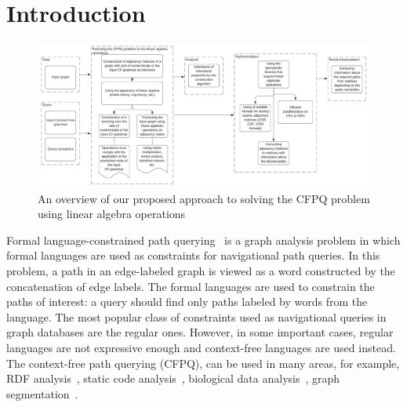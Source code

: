 \documentclass[sigconf, nonacm]{acmart}
\newcommand\vldbavailabilityurl{http://vldb.org/pvldb/format_vol14.html}
\begin{document}

\section{Introduction}

\begin{figure}[t]
	\centering
	\includegraphics[width=\linewidth]{figures/schema eng.pdf}
	\caption{An overview of our proposed approach to solving the CFPQ problem using linear algebra operations}
	\label{fig:schema}
\end{figure}

Formal language-constrained path querying~\cite{doi:10.1137/S0097539798337716} is a graph analysis problem in which formal languages are used as constraints for
navigational path queries. In this problem, a path in an edge-labeled graph is viewed
as a word constructed by the concatenation of edge labels. The formal languages are used to constrain the paths of interest: a query should find only paths labeled by words from the language. The most popular class of constraints used as navigational queries in graph databases are the regular ones.
However, in some important cases, regular languages are not expressive enough and context-free languages are used instead. The context-free path querying (CFPQ), can be used in many areas, for example, RDF analysis~\cite{10.1007/978-3-319-46523-4_38}, static code analysis~\cite{Zheng,10.1145/373243.360208}, biological data analysis~\cite{SubgraphQueriesbyContextfreeGrammars}, graph segmentation~\cite{8731467}.
\end{document}
